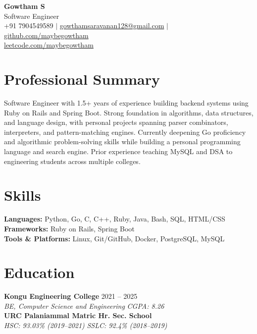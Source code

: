 \documentclass[10pt,letterpaper]{article}
\newcommand{\resumeEntry}[4]{
  \textbf{#1} \hfill #2 \\
  \textit{#3} \hfill \textit{#4} \\[0pt]
}
\begin{document}
\begin{center}
  {\LARGE \textbf{Gowtham S}} \\[3pt]
  {\large Software Engineer} \\[4pt]
  +91 7904549589 \quad $\vert$ \quad
  \href{mailto:gowthamsaravanan128@gmail.com}{gowthamsaravanan128@gmail.com} \quad $\vert$ \quad
  \href{https://github.com/maybegowtham/}{github.com/maybegowtham} \\[1pt]
  \href{https://leetcode.com/maybegowtham/}{leetcode.com/maybegowtham}
\end{center}

\section*{Professional Summary}
Software Engineer with 1.5+ years of experience building backend systems using Ruby on Rails and Spring Boot. Strong foundation in algorithms, data structures, and language design, with personal projects spanning parser combinators, interpreters, and pattern-matching engines. Currently deepening Go proficiency and algorithmic problem-solving skills while building a personal programming language and search engine. Prior experience teaching MySQL and DSA to engineering students across multiple colleges.

\section*{Skills}
\textbf{Languages:} Python, Go, C, C++, Ruby, Java, Bash, SQL, HTML/CSS \\[3pt]
\textbf{Frameworks:} Ruby on Rails, Spring Boot \\[3pt]
\textbf{Tools \& Platforms:} Linux, Git/GitHub, Docker, PostgreSQL, MySQL

\section*{Education}
\resumeEntry{Kongu Engineering College}{2021 -- 2025}{BE, Computer Science and Engineering}{CGPA: 8.26}
\textbf{URC Palaniammal Matric Hr. Sec. School} \hfill \\
\textit{HSC: 93.03\% (2019--2021)} \hfill \textit{SSLC: 92.4\% (2018--2019)}
\end{document}
